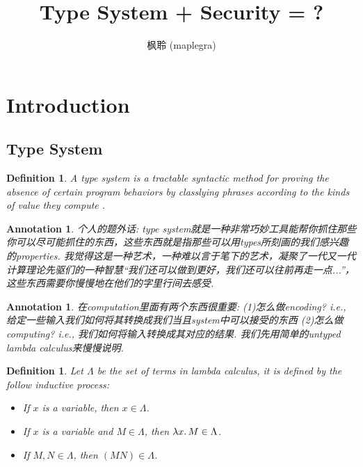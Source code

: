 \documentclass{article}
\newtheorem{definition}[theorem]{Definition}
\newtheorem{annotation}[theorem]{Annotation}
\newcommand{\lam}[2]{\ensuremath{\lambda #1\ldotp #2}} %
\begin{document}
\title{Type System + Security = ?}
\author{枫聆 (maplegra)}
\maketitle
\tableofcontents
\newpage

\section{Introduction}

\subsection{Type System}

\begin{definition}
\rm A {\color{red} type system} is a tractable syntactic method for proving the absence of certain program behaviors by classlying phrases according to the kinds of value they compute \cite{TAPL}.
\end{definition}

\begin{annotation}
\rm 个人的题外话: type system就是一种非常巧妙工具能帮你抓住那些你可以尽可能抓住的东西，这些东西就是指那些可以用types所刻画的我们感兴趣的properties. 我觉得这是一种艺术，一种难以言于笔下的艺术，凝聚了一代又一代计算理论先驱们的一种智慧“我们还可以做到更好，我们还可以往前再走一点...”，这些东西需要你慢慢地在他们的字里行间去感受. 
\end{annotation}

\begin{annotation}
\rm 在computation里面有两个东西很重要: (1)怎么做encoding? i.e., 给定一些输入我们如何将其转换成我们当且system中可以接受的东西 (2)怎么做computing? i.e., 我们如何将输入转换成其对应的结果. 我们先用简单的untyped lambda calculus来慢慢说明. 
\end{annotation}

\begin{definition}
\rm Let $\Lambda$ be the set of terms in lambda calculus, it is defined by the follow inductive process:
\begin{itemize}
	\item If $x$ is a variable, then $x \in \Lambda$.
	\item If $x$ is a variable and $M \in \Lambda$, then $\lam{x}{M} \in \Lambda$.
	\item If $M, N \in \Lambda$, then $(M N) \in \Lambda$.
\end{itemize}
\end{definition}
\end{document}
